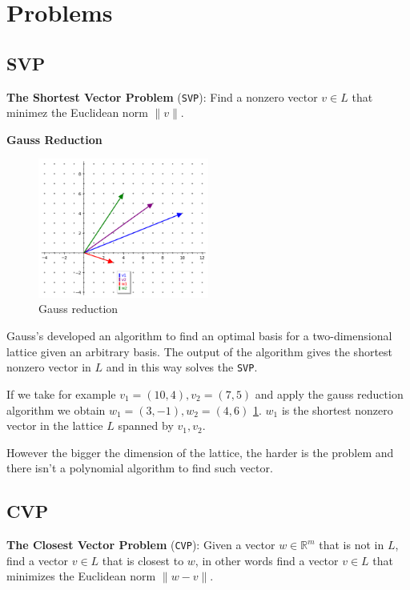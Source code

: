 \documentclass[a4paper,12pt]{report}
\newcommand{\R}{\mathbb{R}}
\begin{document}
\section{Problems}

\subsection{SVP}

\textbf{The Shortest Vector Problem} (\texttt{SVP}): Find a nonzero vector $v \in L$ that minimez the Euclidean norm $\lVert v \rVert$.

\begin{algorithm}
    \textbf{Gauss Reduction}
\end{algorithm}

\begin{figure}[b]
    \centering
    \includegraphics[width=0.5\textwidth]{./img/gauss_svp.png}
    \caption{Gauss reduction}
    \label{fig:gauss_svp}
\end{figure}

Gauss's developed an algorithm to find an optimal basis for a two-dimensional lattice given an arbitrary basis. The output of the algorithm
gives the shortest nonzero vector in $L$ and in this way solves the \texttt{SVP}.

If we take for example $v_1 = (10, 4), v_2 = (7, 5)$ and apply the gauss reduction algorithm we
obtain $w_1 = (3, -1), w_2 = (4, 6)$ \ref{fig:gauss_svp}. $w_1$ is the shortest nonzero vector in the lattice $L$ spanned by $v_1, v_2$.

However the bigger the dimension of the lattice, the harder is the problem and there isn't a polynomial algorithm to find such vector.

\subsection{CVP}

\textbf{The Closest Vector Problem} (\texttt{CVP}): Given a vector $w \in \R^m$ that is not in $L$, find a vector $v \in L$ that is closest to $w$,
in other words find a vector $v \in L$ that minimizes the Euclidean norm $\lVert w - v \rVert$.
\end{document}
